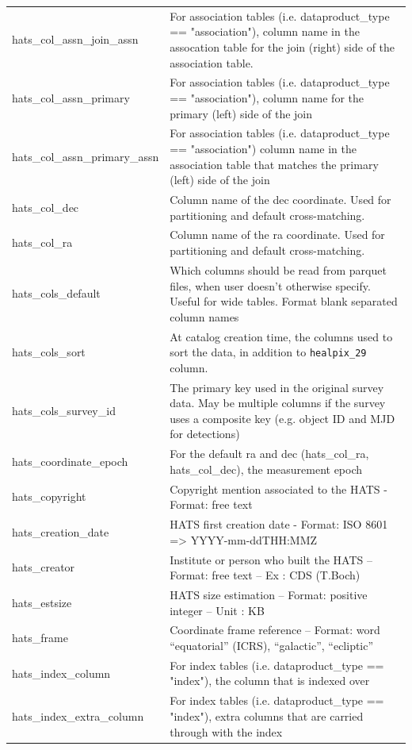 \documentclass[11pt,a4paper]{ivoa}
\begin{document}
\begin{longtable}[h!]{D{0.33\textwidth} D{0.67\textwidth}}
hats\_col\_assn\_join\_assn &For association tables (i.e. dataproduct\_type == "association"), column name in the assocation table for the join (right) side of the association table. \\
hats\_col\_assn\_primary &For association tables (i.e. dataproduct\_type == "association"), column name for the primary (left) side of the join \\
hats\_col\_assn\_primary\_assn &For association tables (i.e. dataproduct\_type == "association") column name in the association table that matches the primary (left) side of the join \\
hats\_col\_dec &Column name of the dec coordinate. Used for partitioning and default cross-matching. \\
hats\_col\_ra &Column name of the ra coordinate. Used for partitioning and default cross-matching. \\
hats\_cols\_default &Which columns should be read from parquet files, when user doesn't otherwise specify. Useful for wide tables. Format blank separated column names \\
hats\_cols\_sort &At catalog creation time, the columns used to sort the data, in addition to \texttt{healpix\_29} column. \\
hats\_cols\_survey\_id &The primary key used in the original survey data. May be multiple columns if the survey uses a composite key (e.g. object ID and MJD for detections) \\
hats\_coordinate\_epoch &For the default ra and dec (hats\_col\_ra, hats\_col\_dec), the measurement epoch \\
hats\_copyright &Copyright mention associated to the HATS - Format: free text \\
hats\_creation\_date &HATS first creation date - Format: ISO 8601 => YYYY-mm-ddTHH:MMZ \\
hats\_creator &Institute or person who built the HATS – Format: free text – Ex : CDS (T.Boch) \\
hats\_estsize &HATS size estimation – Format: positive integer – Unit : KB \\
hats\_frame &Coordinate frame reference – Format: word “equatorial” (ICRS), “galactic”, “ecliptic” \\
hats\_index\_column &For index tables (i.e. dataproduct\_type == "index"), the column that is indexed over \\
hats\_index\_extra\_column &For index tables (i.e. dataproduct\_type == "index"), extra columns that are carried through with the index \\

\end{longtable}
\end{document}
